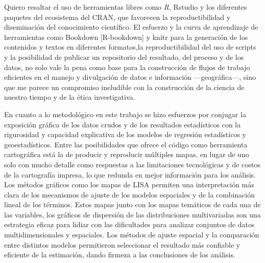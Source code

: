 \documentclass[12pt,]{book}
\begin{document}
Quiero resaltar el uso de herramientas libres como \emph{R}, Rstudio y
los diferentes paquetes del ecosistema del CRAN, que favorecen la
reproductibilidad y diseminación del conocimiento científico. El
esfuerzo y la curva de aprendizaje de herramientas como Bookdown
{[}R-bookdown{]} y knitr \citep{R-knitr} para la generación de los
contenidos y textos en diferentes formatos,la reproductibilidad del uso
de scripts y la posibilidad de publicar un repositorio del resultado,
del proceso y de los datos, no solo vale la pena como base para la
construcción de flujos de trabajo eficientes en el manejo y divulgación
de datos e información ---geográfica---, sino que me parece un
compromiso ineludible con la construcción de la ciencia de nuestro
tiempo y de la ética investigativa.

En cuanto a lo metodológico en este trabajo se hizo esfuerzos por
conjugar la exposición gráfica de los datos crudos y de los resultados
estadísticos con la rigurosidad y capacidad explicativa de los modelos
de regresión estadísticos y geoestadísticos. Entre las posibilidades que
ofrece el código como herramienta cartográfica está la de producir y
reproducir múltiples mapas, en lugar de uno solo con mucho detalle como
respuestas a las limitaciones tecnológicas y de costos de la cartografía
impresa, lo que redunda en mejor información para los análisis. Los
métodos gráficos como los mapas de LISA permiten una interpretación más
clara de los mecanismos de ajuste de los modelos espaciales y de la
combinación lineal de los términos. Estos mapas junto con los mapas
temáticos de cada una de las variables, los gráficos de dispersión de
las distribuciones multivariadas son una estrategia eficaz para lidiar
con las dificultades para analizar conjuntos de datos multidimensionales
y espaciales. Los métodos de ajuste espacial y la comparación entre
distintos modelos permitieron seleccionar el resultado más confiable y
eficiente de la estimación, dando firmeza a las conclusiones de los
análisis.
\end{document}
